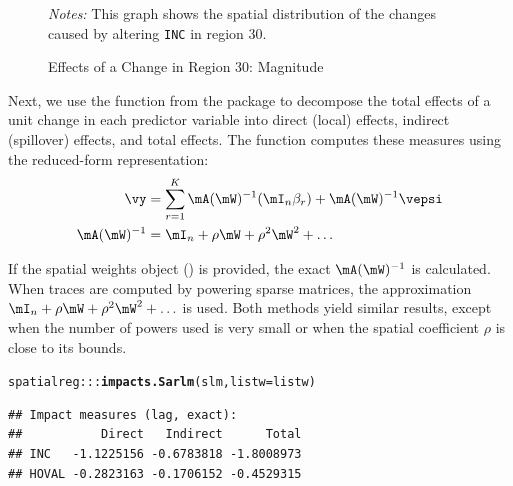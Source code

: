 \documentclass[english,12pt]{book}\usepackage[]{graphicx}\usepackage[]{xcolor}
\makeatletter
\newcommand{\hlopt}[1]{\textcolor[rgb]{0,0,0}{#1}}%
\newcommand{\hldef}[1]{\textcolor[rgb]{0.345,0.345,0.345}{#1}}%
\newcommand{\hlkwc}[1]{\textcolor[rgb]{0.333,0.667,0.333}{#1}}%
\newcommand{\hlkwd}[1]{\textcolor[rgb]{0.737,0.353,0.396}{\textbf{#1}}}%
\newenvironment{kframe}{%
 \def\at@end@of@kframe{}%
 \ifinner\ifhmode%
  \def\at@end@of@kframe{\end{minipage}}%
  \begin{minipage}{\columnwidth}%
 \fi\fi%
 \def\FrameCommand##1{\hskip\@totalleftmargin \hskip-\fboxsep
 \colorbox{shadecolor}{##1}\hskip-\fboxsep
     \hskip-\linewidth \hskip-\@totalleftmargin \hskip\columnwidth}%
 \MakeFramed {\advance\hsize-\width
   \@totalleftmargin\z@ \linewidth\hsize
   \@setminipage}}%
 {\par\unskip\endMakeFramed%
 \at@end@of@kframe}
\newenvironment{knitrout}{}{} %
\makeatother
\begin{document}
\begin{figure}[ht]
  \caption{Effects of a Change in Region 30: Magnitude}
    \label{fig:predicted-effect2}
        \centering 
	\begin{minipage}{.9\linewidth}
\begin{knitrout}
\color{fgcolor}\begin{kframe}


{\ttfamily\noindent\bfseries{}}

{\ttfamily\noindent\bfseries\color{errorcolor}{\#\# Error: object 'cats5' not found}}

{\ttfamily\noindent\bfseries\color{errorcolor}{\#\# Error: object 'colors5' not found}}

{\ttfamily\noindent\bfseries\color{errorcolor}{\#\# Error: object 'cats5' not found}}\end{kframe}
\end{knitrout}
\footnotesize
		\emph{Notes:} This graph shows the spatial distribution of the changes caused by altering \texttt{INC} in region 30.
	\end{minipage}
\end{figure}


Next, we use the  function from the  package to decompose the total effects of a unit change in each predictor variable into direct (local) effects, indirect (spillover) effects, and total effects. The  function computes these measures using the reduced-form representation:
\begin{equation*}
  \begin{aligned}
    \vy & = \sum_{r = 1}^K \mA(\mW)^{-1}(\mI_n\beta_r) + \mA(\mW)^{-1}\vepsi \\
     \mA(\mW)^{-1} & = \mI_n + \rho\mW + \rho^2\mW^2 + \ldots
  \end{aligned}
\end{equation*}

If the spatial weights object () is provided, the exact $\mA(\mW)^{-1}$ is calculated. When traces are computed by powering sparse matrices, the approximation $\mI_n + \rho\mW + \rho^2\mW^2 + \ldots$ is used. Both methods yield similar results, except when the number of powers used is very small or when the spatial coefficient $\rho$ is close to its bounds.

\begin{knitrout}
\color{fgcolor}\begin{kframe}
\begin{alltt}
\hldef{spatialreg}\hlopt{:::}\hlkwd{impacts.Sarlm}\hldef{(slm,} \hlkwc{listw} \hldef{= listw)}
\end{alltt}
\begin{verbatim}
## Impact measures (lag, exact):
##           Direct   Indirect      Total
## INC   -1.1225156 -0.6783818 -1.8008973
## HOVAL -0.2823163 -0.1706152 -0.4529315
\end{verbatim}
\end{kframe}
\end{knitrout}
\end{document}
